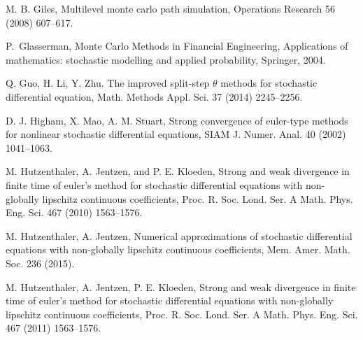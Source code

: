 \documentclass[sort&compress, preprint]{elsarticle}
\theoremstyle{definition}
\theoremstyle{plain}%
\theoremstyle{remark}
\begin{document}
\begin{thebibliography}{26}
M. B. Giles,
\newblock Multilevel monte carlo path simulation,
\newblock Operations Research 56 (2008) 607--617.

P.~Glasserman,
\newblock Monte Carlo Methods in Financial Engineering,
\newblock Applications of mathematics: stochastic modelling and applied
  probability, Springer, 2004.
  
Q. Guo, H. Li, Y. Zhu.
\newblock The improved split-step $\theta$ methods for stochastic differential
  equation,
\newblock Math. Methods Appl. Sci. 37 (2014) 2245--2256.


% 

D. J. Higham, X. Mao,  A. M. Stuart,
\newblock Strong convergence of euler-type methods for nonlinear stochastic
  differential equations,
\newblock  SIAM J. Numer. Anal. 40  (2002)  1041--1063.

M. Hutzenthaler, A. Jentzen, and P. E. Kloeden,
\newblock Strong and weak divergence in finite time of euler's method for
  stochastic differential equations with non-globally lipschitz continuous
  coefficients,
\newblock Proc. R. Soc. Lond. Ser. A Math. Phys. Eng. Sci. 467 (2010) 1563--1576.


M. Hutzenthaler, A. Jentzen, 
\newblock Numerical approximations of stochastic differential equations with
  non-globally lipschitz continuous coefficients,
\newblock Mem. Amer. Math. Soc. 236 (2015).


M. Hutzenthaler, A. Jentzen,  P. E. Kloeden,
\newblock Strong and weak divergence in finite time of euler's method for
  stochastic differential equations with non-globally lipschitz continuous
  coefficients,
\newblock Proc. R. Soc. Lond. Ser. A Math. Phys. Eng. Sci. 467 (2011) 1563--1576.



\end{thebibliography}
\end{document}
